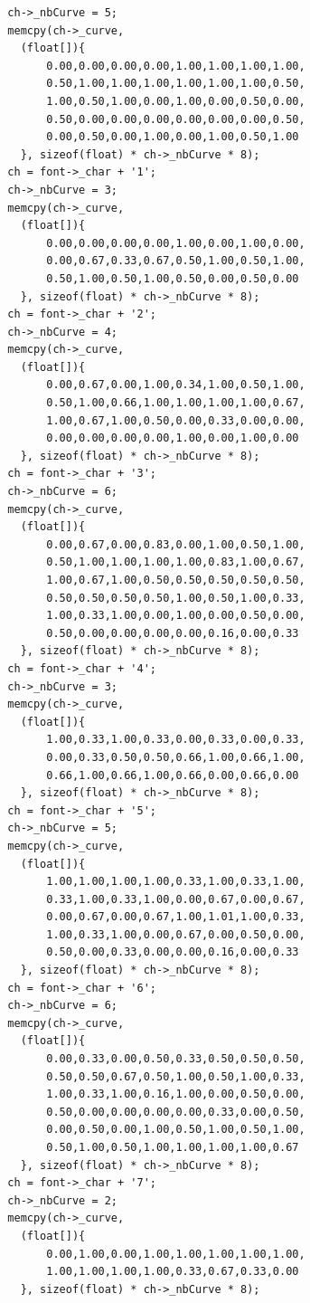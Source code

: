 \documentclass[12pt, a4paper]{article}
\begin{document}
\begin{scriptsize}
\begin{ttfamily}
\begin{lstlisting}
  ch->_nbCurve = 5;
  memcpy(ch->_curve, 
    (float[]){
        0.00,0.00,0.00,0.00,1.00,1.00,1.00,1.00,
        0.50,1.00,1.00,1.00,1.00,1.00,1.00,0.50,
        1.00,0.50,1.00,0.00,1.00,0.00,0.50,0.00,
        0.50,0.00,0.00,0.00,0.00,0.00,0.00,0.50,
        0.00,0.50,0.00,1.00,0.00,1.00,0.50,1.00
    }, sizeof(float) * ch->_nbCurve * 8);
  ch = font->_char + '1';
  ch->_nbCurve = 3;
  memcpy(ch->_curve, 
    (float[]){
        0.00,0.00,0.00,0.00,1.00,0.00,1.00,0.00,
        0.00,0.67,0.33,0.67,0.50,1.00,0.50,1.00,
        0.50,1.00,0.50,1.00,0.50,0.00,0.50,0.00
    }, sizeof(float) * ch->_nbCurve * 8);
  ch = font->_char + '2';
  ch->_nbCurve = 4;
  memcpy(ch->_curve, 
    (float[]){
        0.00,0.67,0.00,1.00,0.34,1.00,0.50,1.00,
        0.50,1.00,0.66,1.00,1.00,1.00,1.00,0.67,
        1.00,0.67,1.00,0.50,0.00,0.33,0.00,0.00,
        0.00,0.00,0.00,0.00,1.00,0.00,1.00,0.00
    }, sizeof(float) * ch->_nbCurve * 8);
  ch = font->_char + '3';
  ch->_nbCurve = 6;
  memcpy(ch->_curve, 
    (float[]){
        0.00,0.67,0.00,0.83,0.00,1.00,0.50,1.00,
        0.50,1.00,1.00,1.00,1.00,0.83,1.00,0.67,
        1.00,0.67,1.00,0.50,0.50,0.50,0.50,0.50,
        0.50,0.50,0.50,0.50,1.00,0.50,1.00,0.33,
        1.00,0.33,1.00,0.00,1.00,0.00,0.50,0.00,
        0.50,0.00,0.00,0.00,0.00,0.16,0.00,0.33
    }, sizeof(float) * ch->_nbCurve * 8);
  ch = font->_char + '4';
  ch->_nbCurve = 3;
  memcpy(ch->_curve, 
    (float[]){
        1.00,0.33,1.00,0.33,0.00,0.33,0.00,0.33,
        0.00,0.33,0.50,0.50,0.66,1.00,0.66,1.00,
        0.66,1.00,0.66,1.00,0.66,0.00,0.66,0.00
    }, sizeof(float) * ch->_nbCurve * 8);
  ch = font->_char + '5';
  ch->_nbCurve = 5;
  memcpy(ch->_curve, 
    (float[]){
        1.00,1.00,1.00,1.00,0.33,1.00,0.33,1.00,
        0.33,1.00,0.33,1.00,0.00,0.67,0.00,0.67,
        0.00,0.67,0.00,0.67,1.00,1.01,1.00,0.33,
        1.00,0.33,1.00,0.00,0.67,0.00,0.50,0.00,
        0.50,0.00,0.33,0.00,0.00,0.16,0.00,0.33
    }, sizeof(float) * ch->_nbCurve * 8);
  ch = font->_char + '6';
  ch->_nbCurve = 6;
  memcpy(ch->_curve, 
    (float[]){
        0.00,0.33,0.00,0.50,0.33,0.50,0.50,0.50,
        0.50,0.50,0.67,0.50,1.00,0.50,1.00,0.33,
        1.00,0.33,1.00,0.16,1.00,0.00,0.50,0.00,
        0.50,0.00,0.00,0.00,0.00,0.33,0.00,0.50,
        0.00,0.50,0.00,1.00,0.50,1.00,0.50,1.00,
        0.50,1.00,0.50,1.00,1.00,1.00,1.00,0.67
    }, sizeof(float) * ch->_nbCurve * 8);
  ch = font->_char + '7';
  ch->_nbCurve = 2;
  memcpy(ch->_curve, 
    (float[]){
        0.00,1.00,0.00,1.00,1.00,1.00,1.00,1.00,
        1.00,1.00,1.00,1.00,0.33,0.67,0.33,0.00
    }, sizeof(float) * ch->_nbCurve * 8);

\end{lstlisting}
\end{ttfamily}
\end{scriptsize}
\end{document}
